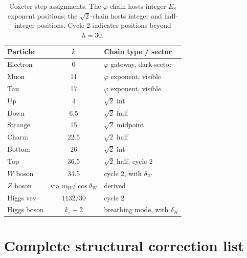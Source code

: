 ﻿\documentclass[reprint,amsmath,amssymb,aps,prd,longbibliography,floatfix]{revtex4-2}
\begin{document}
\begin{table}[h]
\centering
\caption{Coxeter step assignments. The $\varphi$-chain hosts integer
$E_8$ exponent positions; the $\sqrt{2}$-chain hosts integer and
half-integer positions. Cycle 2 indicates positions beyond $h = 30$.}
\begin{tabular}{lcl}
\toprule
Particle & $k$ & Chain type / sector \\
\midrule
Electron      & 0       & $\varphi$ gateway, dark-sector \\
Muon          & 11      & $\varphi$ exponent, visible \\
Tau           & 17      & $\varphi$ exponent, visible \\
Up            & 4       & $\sqrt{2}$ int \\
Down          & 6.5     & $\sqrt{2}$ half \\
Strange       & 15      & $\sqrt{2}$ midpoint \\
Charm         & 22.5    & $\sqrt{2}$ half \\
Bottom        & 26      & $\sqrt{2}$ int \\
Top           & 36.5    & $\sqrt{2}$ half, cycle 2 \\
$W$ boson     & 34.5    & cycle 2, with $\delta_W$ \\
$Z$ boson     & via $m_W/\cos\theta_W$ & derived \\
Higgs vev     & $1132/30$ & cycle 2 \\
Higgs boson   & $k_v - 2$ & breathing mode, with $\delta_H$ \\
\bottomrule
\end{tabular}
\end{table}

\section{Complete structural correction list}
\label{app:corrections}
\end{document}

